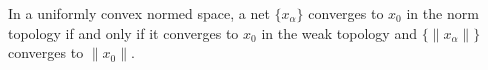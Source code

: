 In a uniformly convex normed space, a net $\{x_\alpha\}$ converges to $x_0$ in the norm topology if and only if it converges to $x_0$ in the weak topology and $\{\|x_\alpha\|\}$ converges to $\|x_0\|$.
